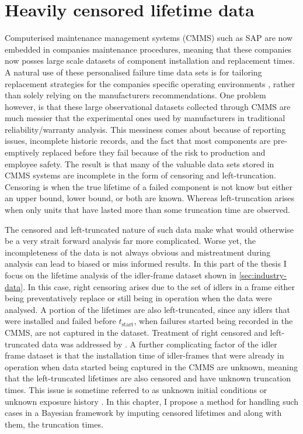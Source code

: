 \chapter{Heavily censored lifetime data}\label{chap:chapter2}

Computerised maintenance management systems (CMMS) such as SAP \citep{sap} are now embedded in companies maintenance procedures, meaning that these companies now posses large scale datasets of component installation and replacement times. A natural use of these personalised failure time data sets is for tailoring replacement strategies for the companies specific operating environments \citep[p. 13]{meeker2022}, rather than solely relying on the manufacturers recommendations. One problem however, is that these large observational datasets collected through CMMS are much messier that the experimental ones used by manufacturers in traditional reliability/warranty analysis. This messiness comes about because of reporting issues, incomplete historic records, and the fact that most components are pre-emptively replaced before they fail because of the risk to production and employee safety. The result is that many of the valuable data sets stored in CMMS systems are incomplete in the form of censoring and left-truncation. Censoring is when the true lifetime of a failed component is not know but either an upper bound, lower bound, or both are known. Whereas left-truncation arises when only units that have lasted more than some truncation time are observed.

The censored and left-truncated nature of such data make what would otherwise be a very strait forward analysis far more complicated. Worse yet, the incompleteness of the data is not always obvious and mistreatment during analysis can lead to biased or miss informed results. In this part of the thesis I focus on the lifetime analysis of the idler-frame dataset shown in \ref{sec:industry-data}. In this case, right censoring arises due to the set of idlers in a frame either being preventatively replace or still being in operation when the data were analysed. A portion of the lifetimes are also left-truncated, since any idlers that were installed and failed before $t_\text{start}$, when failures started being recorded in the CMMS, are not captured in the dataset. Treatment of right censored and left-truncated data was addressed by \citet{hong2009}. A further complicating factor of the idler frame dataset is that the installation time of idler-frames that were already in operation when data started being captured in the CMMS are unknown, meaning that the left-truncated lifetimes are also censored and have unknown truncation times. This issue is sometime referred to as unknown initial conditions \citep{} or unknown exposure history \citep{}. In this chapter, I propose a method for handling such cases in a Bayesian framework by imputing censored lifetimes and along with them, the truncation times.

